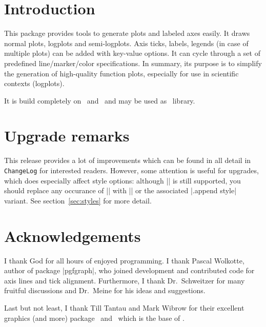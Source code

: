\maketitle
\begin{abstract}%
\PGFPlots\ draws high--quality function plots in normal or logarithmic scaling with a user-friendly interface directly in \TeX. The user supplies axis labels, legend entries and the plot coordinates for one or more plots and \PGFPlots\ applies axis scaling, computes any logarithms and axis ticks and draws the plots, supporting line plots, piecewise constant plots, bar plots and area plots. It is based on Till Tantau's package \PGF/\Tikz.
\end{abstract}
\tableofcontents
\section{Introduction}
This package provides tools to generate plots and labeled axes easily. It draws normal plots, logplots and semi-logplots. Axis ticks, labels, legends (in case of multiple plots) can be added with key-value options. It can cycle through a set of predefined line/marker/color specifications. In summary, its purpose is to simplify the generation of high-quality function plots, especially for use in scientific contexts (logplots).

It is build completely on \Tikz\ and \PGF\ and may be used as \Tikz\ library. 

\section{Upgrade remarks}
This release provides a lot of improvements which can be found in all detail in \texttt{ChangeLog} for interested readers. However, some attention is useful for upgrades, which does especially affect style options: although |\tikzstyle| is still supported, you should replace any occurance of |\tikzstyle| with || or the associated |.append style| variant. See section~\ref{sec:styles} for more detail.

\section{Acknowledgements}
I thank God for all hours of enjoyed programming. I thank Pascal Wolkotte, author of package |pgfgraph|, who joined development and contributed code for axis lines and tick alignment. Furthermore, I thank Dr.~Schweitzer for many fruitful discussions and Dr.~Meine for his ideas and suggestions.

Last but not least, I thank Till Tantau and Mark Wibrow for their excellent graphics (and more) package \PGF\ and \Tikz\ which is the base of \PGFPlots.


%
%
%
%
%

\printindex



